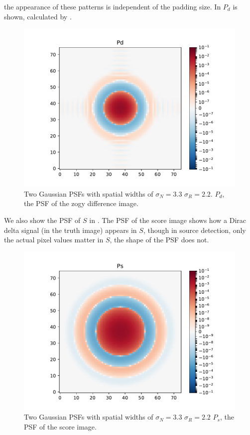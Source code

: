 the appearance of these patterns is independent of the padding
size.
%
In  \(P_d\) is shown, calculated by .
\begin{figure}
\begin{center}
\includegraphics[width=5.5in]{fig/twoG_defaults_Pd.pdf}
\end{center}
\caption{\label{fig:twoG_pd}Two Gaussian PSFs with spatial widths of
  \(\sigma_N = 3.3\) \(\sigma_R = 2.2\). \(P_d\), the PSF of the zogy
  difference image.}
\end{figure}
We also show the PSF of \(S\) in . The PSF of the
score image shows how a Dirac delta signal (in the truth image)
appears in \(S\), though in source detection, only the actual pixel
values matter in \(S\), the shape of the PSF does not.
\begin{figure}
  \begin{center}
    \includegraphics[width=5.5in]{fig/twoG_defaults_Ps.pdf}
  \end{center}
\caption{\label{fig:twoG_ps}Two Gaussian PSFs with spatial widths of
  \(\sigma_N = 3.3\) \(\sigma_R = 2.2\) \(P_s\), the PSF of the score
  image.}
\end{figure}
